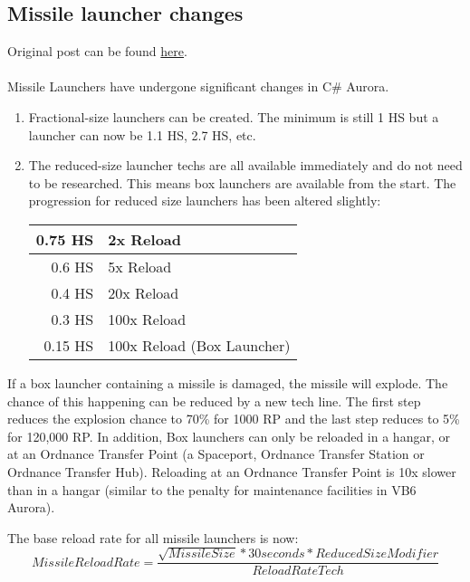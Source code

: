 \documentclass[../../Aurora C# unofficial manual.tex]{subfiles}
\begin{document}
	\subsection{Missile launcher changes}\label{missile_launcher_changes}
	Original post can be found
	\href{http://aurora2.pentarch.org/index.php?topic=8495.msg102815#msg102815}{here}.
	\\\\
	
	Missile Launchers have undergone significant changes in C\# Aurora.
	\begin{enumerate}
		\item Fractional-size launchers can be created. The minimum is still 1 HS but a launcher can now be 1.1 HS, 2.7 HS, etc.
		\item The reduced-size launcher techs are all available immediately and do not need to be researched. This means box launchers are available from the start. The progression for reduced size launchers has been altered slightly:
		
		\begin{center}
			\begin{tabular}{|r|l|}
				\hline
				0.75 HS & 2x Reload \\
				\hline
				0.6 HS & 5x Reload \\
				\hline
				0.4 HS & 20x Reload \\
				\hline
				0.3 HS & 100x Reload \\
				\hline
				0.15 HS & 100x Reload (Box Launcher)\footnotemark \\
				\hline
			\end{tabular}
		\end{center}
	\end{enumerate}
	
	If a box launcher containing a missile is damaged, the missile will explode. The chance of this happening can be reduced by a new tech line. The first step reduces the explosion chance to 70\% for 1000 RP and the last step reduces to 5\% for 120,000 RP. In addition, Box launchers can only be reloaded in a hangar, or at an Ordnance Transfer Point (a Spaceport, Ordnance Transfer Station or Ordnance Transfer Hub). Reloading at an Ordnance Transfer Point is 10x slower than in a hangar (similar to the penalty for maintenance facilities in VB6 Aurora).
	
	The base reload rate for all missile launchers is now:
	\[ Missile Reload Rate = \frac{\sqrt{Missile Size} * 30 seconds * Reduced Size Modifier}{Reload Rate Tech} \]
	
\end{document}
